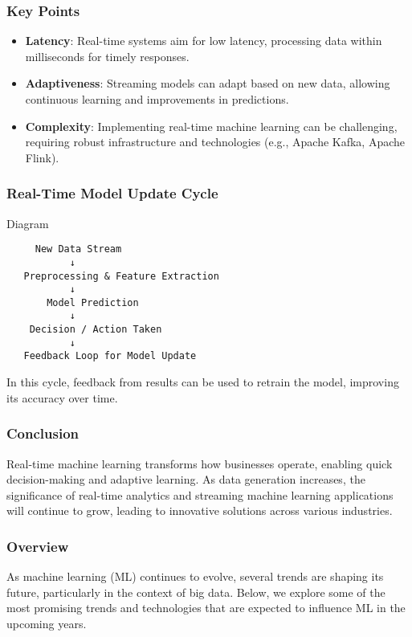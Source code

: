 \documentclass[aspectratio=169]{beamer}
\begin{document}
\begin{frame}[fragile]
    \frametitle{Key Points}
    \begin{itemize}
        \item \textbf{Latency}: Real-time systems aim for low latency, processing data within milliseconds for timely responses.
        
        \item \textbf{Adaptiveness}: Streaming models can adapt based on new data, allowing continuous learning and improvements in predictions.
        
        \item \textbf{Complexity}: Implementing real-time machine learning can be challenging, requiring robust infrastructure and technologies (e.g., Apache Kafka, Apache Flink).
    \end{itemize}
\end{frame}

\begin{frame}[fragile]
    \frametitle{Real-Time Model Update Cycle}
    \begin{block}{Diagram}
        \centering
        \begin{verbatim}
     New Data Stream
           ↓
   Preprocessing & Feature Extraction
           ↓
       Model Prediction
           ↓
    Decision / Action Taken
           ↓
   Feedback Loop for Model Update
        \end{verbatim}
    \end{block}
    In this cycle, feedback from results can be used to retrain the model, improving its accuracy over time.
\end{frame}

\begin{frame}[fragile]
    \frametitle{Conclusion}
    Real-time machine learning transforms how businesses operate, enabling quick decision-making and adaptive learning. As data generation increases, the significance of real-time analytics and streaming machine learning applications will continue to grow, leading to innovative solutions across various industries.
\end{frame}

\begin{frame}[fragile]
    \frametitle{Overview}
    As machine learning (ML) continues to evolve, several trends are shaping its future, particularly in the context of big data. Below, we explore some of the most promising trends and technologies that are expected to influence ML in the upcoming years.
\end{frame}
\end{document}
